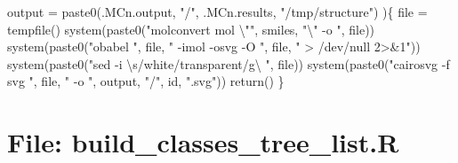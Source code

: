 \documentclass[
]{article}
\newenvironment{Shaded}{\begin{snugshade}}{\end{snugshade}}
\newcommand{\AttributeTok}[1]{\textcolor[rgb]{0.77,0.63,0.00}{#1}}
\newcommand{\FunctionTok}[1]{\textcolor[rgb]{0.00,0.00,0.00}{#1}}
\newcommand{\NormalTok}[1]{#1}
\newcommand{\OtherTok}[1]{\textcolor[rgb]{0.56,0.35,0.01}{#1}}
\newcommand{\SpecialCharTok}[1]{\textcolor[rgb]{0.00,0.00,0.00}{#1}}
\newcommand{\StringTok}[1]{\textcolor[rgb]{0.31,0.60,0.02}{#1}}
\begin{document}
\begin{Shaded}
\begin{Highlighting}[]
           \AttributeTok{output =} \FunctionTok{paste0}\NormalTok{(.MCn.output, }\StringTok{"/"}\NormalTok{, .MCn.results, }\StringTok{"/tmp/structure"}\NormalTok{)}
\NormalTok{           )\{}
\NormalTok{    file }\OtherTok{=} \FunctionTok{tempfile}\NormalTok{()}
    \FunctionTok{system}\NormalTok{(}\FunctionTok{paste0}\NormalTok{(}\StringTok{"molconvert mol }\SpecialCharTok{\textbackslash{}"}\StringTok{"}\NormalTok{, smiles, }\StringTok{"}\SpecialCharTok{\textbackslash{}"}\StringTok{ {-}o "}\NormalTok{, file))}
    \FunctionTok{system}\NormalTok{(}\FunctionTok{paste0}\NormalTok{(}\StringTok{"obabel "}\NormalTok{, file, }\StringTok{" {-}imol {-}osvg {-}O "}\NormalTok{, file, }\StringTok{" \textgreater{} /dev/null 2\textgreater{}\&1"}\NormalTok{))}
    \FunctionTok{system}\NormalTok{(}\FunctionTok{paste0}\NormalTok{(}\StringTok{"sed {-}i }\SpecialCharTok{\textbackslash{}\textquotesingle{}}\StringTok{s/white/transparent/g}\SpecialCharTok{\textbackslash{}\textquotesingle{}}\StringTok{ "}\NormalTok{, file))}
    \FunctionTok{system}\NormalTok{(}\FunctionTok{paste0}\NormalTok{(}\StringTok{"cairosvg {-}f svg "}\NormalTok{, file, }\StringTok{" {-}o "}\NormalTok{, output, }\StringTok{"/"}\NormalTok{, id, }\StringTok{".svg"}\NormalTok{))}
    \FunctionTok{return}\NormalTok{()}
\NormalTok{  \}}
\end{Highlighting}
\end{Shaded}

\hypertarget{file-build_classes_tree_list.r}{%
\section{File: build\_classes\_tree\_list.R}\label{file-build_classes_tree_list.r}}
\end{document}
